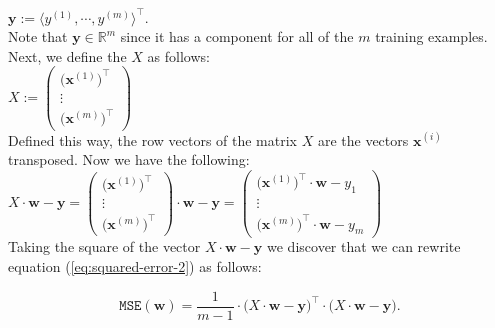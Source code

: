 \documentclass[12pt]{article}
\begin{document}
\\[0.2cm]
\hspace*{1.3cm}
$\mathbf{y} := \langle y^{(1)}, \cdots, y^{(m)} \rangle^\top$.
\\[0.2cm]
Note that $\mathbf{y} \in \mathbb{R}^m$ since it has a component for all of the $m$ training
examples.  Next, we define the {\color{blue}{design matrix}} $X$ as follows:
\\[0.2cm]
\hspace*{1.3cm}
$X := \left(
  \begin{array}{c}
    \bigl(\mathbf{x}^{(1)}\bigr)^\top  \\
    \vdots                         \\
    \bigl(\mathbf{x}^{(m)}\bigr)^\top
  \end{array}
  \right)   
$
\\[0.2cm]
Defined this way, the row vectors of the matrix $X$ are the vectors $\mathbf{x}^{(i)}$ transposed.
Now we have the following:
\\[0.2cm]
\hspace*{1.3cm}
$X \cdot \mathbf{w} - \mathbf{y} = \left(
  \begin{array}{c}
    \bigl(\mathbf{x}^{(1)}\bigr)^\top  \\
    \vdots                         \\
    \bigl(\mathbf{x}^{(m)}\bigr)^\top
  \end{array}
  \right) \cdot \mathbf{w} - \mathbf{y} = \left(
  \begin{array}{c}
    \bigl(\mathbf{x}^{(1)}\bigr)^\top \cdot \mathbf{w} - y_1 \\
    \vdots                         \\
    \bigl(\mathbf{x}^{(m)}\bigr)^\top \cdot \mathbf{w} - y_m
  \end{array}
  \right)
$
\\[0.2cm]
Taking the square of the vector $X \cdot \mathbf{w} - \mathbf{y}$ we discover that we can rewrite equation (\ref{eq:squared-error-2}) as follows:

\begin{equation}
  \label{eq:squared-error-3}
  \mathtt{MSE}(\mathbf{w}) = \frac{1}{m-1} \cdot \bigl(X \cdot \mathbf{w} - \textbf{y}\bigr)^\top \cdot \bigl(X \cdot \mathbf{w} - \textbf{y}\bigr).
\end{equation}\\

{\color{red}{********************************************************************************\\ Um das minimale MSE(w) zu bekommen, sagt uns die Mathematik (Analysis I), müssen wir den "Gradienten" der Funktion MSE(w)" null setzen. Die folgenden Berechnungen sind hier noch zu ergänzen. Nützlich dazu ist die Matrizenrechnung aus der Linearen Algebra.\\ *******************************************************************************}}\\ 
\end{document}
